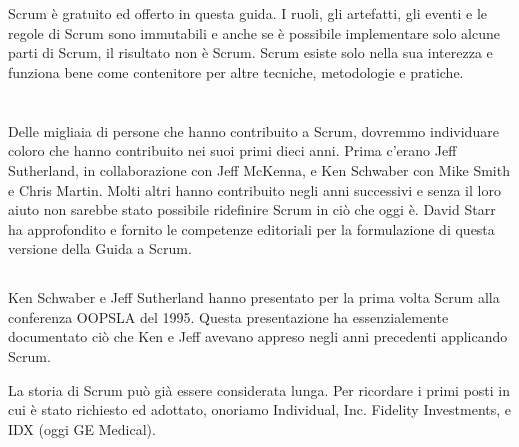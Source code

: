 
\section*{\color{Blue}{Conclusioni}}
\label{sec:conclusion}
Scrum è gratuito ed offerto in questa guida. I ruoli, gli artefatti, gli eventi e le regole di Scrum sono immutabili e anche se \`e possibile implementare solo alcune parti di Scrum, il risultato non \`e Scrum. Scrum esiste solo nella sua interezza e funziona bene come contenitore per altre tecniche, metodologie e pratiche.


\section*{\color{Blue}{Ringraziamenti}}
\label{sec:acknowledgements}

\subsection*{\color{SteelBlue}{Persone}}
\label{sec:people}
Delle migliaia di persone che hanno contribuito a Scrum, dovremmo individuare coloro che hanno contribuito nei suoi
primi dieci anni. Prima c'erano Jeff Sutherland, in collaborazione con Jeff McKenna, e Ken Schwaber con Mike Smith e
Chris Martin. Molti altri hanno contribuito negli anni successivi e senza il loro aiuto non sarebbe stato possibile ridefinire Scrum in ci\`o che oggi \`e. David Starr ha approfondito e fornito le competenze editoriali per la formulazione di questa versione della Guida a Scrum.

\subsection*{\color{SteelBlue}{Storia}}
\label{sec:history}
Ken Schwaber e Jeff Sutherland hanno presentato per la prima volta Scrum alla conferenza OOPSLA del 1995. Questa presentazione ha essenzialemente documentato ci\`o che Ken e Jeff avevano appreso negli anni precedenti applicando Scrum.

La storia di Scrum pu\`o gi\`a essere considerata lunga. Per ricordare i primi posti in cui \`e stato richiesto ed adottato, onoriamo Individual, Inc. Fidelity Investments, e IDX (oggi GE Medical).

